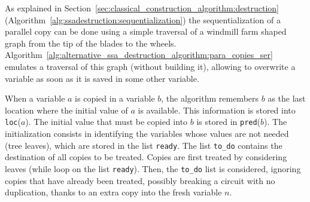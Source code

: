 As explained in Section~\ref{sec:classical_construction_algorithm:destruction} (Algorithm~\ref{alg:ssadestruction:sequentialization}) the sequentialization of a parallel copy can be done using a simple traversal of a windmill farm shaped graph from the tip of the blades to the wheels. 
Algorithm~\ref{alg:alternative_ssa_destruction_algorithm:para_copies_ser} emulates a traversal of this graph (without building it), allowing to overwrite a variable as soon as it is saved in some other variable.

When a variable $a$ is copied in a variable $b$, the algorithm remembers $b$ as the last location where the initial value of $a$ is available. 
This information is stored into \texttt{loc}($a$). 
The initial value that must be copied into $b$ is stored in \texttt{pred}($b$). 
The initialization consists in identifying the variables whose values are not needed (tree leaves), which are stored in the list \texttt{ready}. 
The list \texttt{to\_do} contains the destination of all copies to be treated. 
Copies are first treated by considering leaves (while loop on the list \texttt{ready}). 
Then, the \texttt{to\_do} list is considered, ignoring copies that have already been treated, possibly breaking a circuit with no duplication, thanks to an extra copy into the fresh variable $n$.

